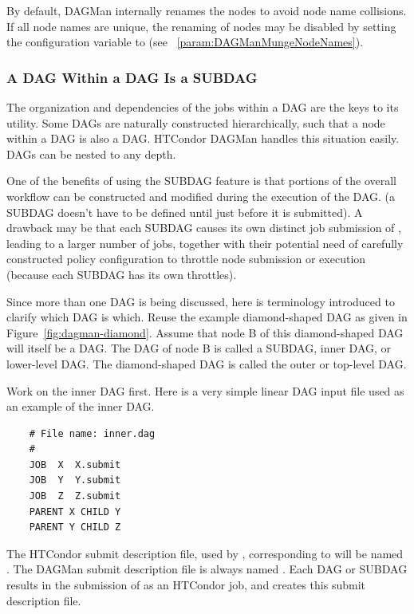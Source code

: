 By default, DAGMan internally renames the nodes to avoid node name collisions.  
If all node names are unique, 
the renaming of nodes may be disabled by
setting the configuration variable 
to  (see ~\ref{param:DAGManMungeNodeNames}).


\subsubsection{\label{sec:DAGsinDAGs}A DAG Within a DAG Is a SUBDAG}

The organization and dependencies of the jobs within a DAG
are the keys to its utility.
Some DAGs are naturally constructed hierarchically,
such that a node within a DAG is also a DAG.
HTCondor DAGMan handles this situation easily.
DAGs can be nested to any depth.

One of the benefits of using the SUBDAG feature is that portions of
the overall workflow
can be constructed and modified during the execution of the DAG.
(a SUBDAG doesn't have to be defined until just before it is submitted).
A drawback may be that each SUBDAG causes its own distinct job submission
of , leading to a larger number of jobs,
together with their potential need of carefully constructed policy
configuration to throttle node submission or execution (because each
SUBDAG has its own throttles).

Since more than one DAG is being discussed, 
here is terminology introduced to clarify which DAG is which. 
Reuse the example diamond-shaped DAG as given in 
Figure~\ref{fig:dagman-diamond}.
Assume that node B of this diamond-shaped DAG
will itself be a DAG.
The DAG of node B is called a SUBDAG, inner DAG, or lower-level DAG.
The diamond-shaped DAG is called the outer or top-level DAG.

Work on the inner DAG first.
Here is a very simple linear DAG input file used as
an example of the inner DAG.
\begin{verbatim}
    # File name: inner.dag
    #
    JOB  X  X.submit
    JOB  Y  Y.submit
    JOB  Z  Z.submit
    PARENT X CHILD Y
    PARENT Y CHILD Z
\end{verbatim}

The HTCondor submit description file, used by ,
corresponding to  will be named
.  The DAGMan submit description file is always
named .
Each DAG or SUBDAG results in the submission of 
as an HTCondor job, and  creates this
submit description file.

